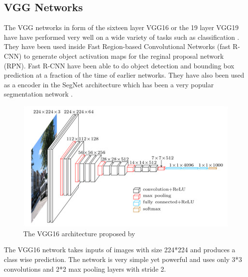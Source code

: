 \documentclass{kththesis}
\begin{document}
\subsection{VGG Networks}
The VGG networks in form of the sixteen layer VGG16 or the 19 layer VGG19 have have performed very well on a wide variety of tasks such as classification \parencite{simonyan_very_2014}. They have been used inside Fast Region-based Convolutional Networks (fast R-CNN) \parencite{ren_faster_2015, girshick_fast_2015} to generate object activation maps for the reginal proposal network (RPN). Fast R-CNN have been able to do object detection and bounding box prediction at a fraction of the time of earlier networks. They have also been used as a encoder in the SegNet architecture which has been a very popular segmentation network \parencite{badrinarayanan_segnet:_2015}.
\begin{figure}[h!]
  \centering
      \includegraphics[scale=0.5]{vgg}
  \caption{The VGG16 architecture proposed by \cite{simonyan_very_2014}} \label{fig:vgg}
\end{figure}
The VGG16 network takes inputs of images with size 224*224 and produces a class wise prediction. The network is very simple yet powerful and uses only 3*3 convolutions and 2*2 max pooling layers with stride 2.
\end{document}

